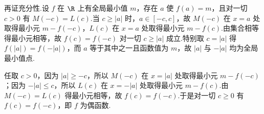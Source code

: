 \begin{solution}
\begin{enumerate}
再证充分性.设 \(f\) 在 \(\R\) 上有全局最小值 \(m\)，存在 \(a\) 使 \(f(a)=m\)，且对一切 \(c>0\) 有 \(M(-c)=L(c)\).当 \(c\ge\left|a\right|\) 时，\(a\in\left[-c,c\right]\)，故 \(M(-c)\) 在 \(x=a\) 处取得最小元 \(m-f(-c)\)，\(L(c)\) 在 \(x=a\) 处取得最小元 \(m-f(c)\).由集合相等得最小元相等，故 \(f(c)=f(-c)\) 对一切 \(c\ge\left|a\right|\) 成立.特别取 \(c=\left|a\right|\) 得 \(f\left(\left|a\right|\right)=f\left(-\left|a\right|\right)\)，而 \(a\) 等于其中之一且函数值为 \(m\)，故 \(\left|a\right|\) 与 \(-\left|a\right|\) 均为全局最小值点.

任取 \(c>0\)，因为 \(\left|a\right|\ge -c\)，所以 \(M(-c)\) 在 \(x=\left|a\right|\) 处取得最小元 \(m-f(-c)\)；因为 \(-\left|a\right|\le c\)，所以 \(L(c)\) 在 \(x=-\left|a\right|\) 处取得最小元 \(m-f(c)\).由 \(M(-c)=L(c)\) 得最小元相等，故 \(f(c)=f(-c)\).于是对一切 \(c\ge 0\) 有 \(f(c)=f(-c)\)，即 \(f\) 为偶函数.
\end{enumerate}
\end{solution}
